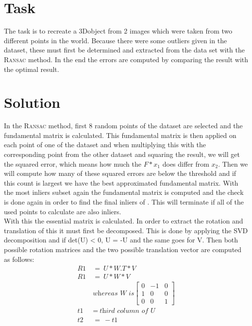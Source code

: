\documentclass{report}
\begin{document}
	\section{Task}
	\startsection
		The task is to recreate a 3Dobject from 2 images which were taken from two different points in the world. Because there were some outliers given in the dataset, these must first be determined and extracted from the data set with the \textsc{Ransac} method. In the end the errors are computed by comparing the result with the optimal result.
	\closesection
	
	\section{Solution}
	\startsection
		In the \textsc{Ransac} method, first 8 random points of the dataset are selected and the fundamental matrix is calculated. This fundamental matrix is then applied on each point of one of the dataset and when multiplying this with the corresponding point from the other dataset and squaring the result, we will get the squared error, which means how much the $F*x_1$ does differ from $x_2$. Then we will compute how many of these squared errors are below the threshold and if this count is largest we have the best approximated fundamental matrix. With the most inliers subset again the fundamental matrix is computed and the check is done again in order to find the final inliers of . This will terminate if all of the used points to calculate  are also inliers. \\
		With this  the essential matrix  is calculated. In order to extract the rotation and translation of this  it must first be decomposed. This is done by applying the SVD decomposition and if det(U) < 0, U = -U and the same goes for V. Then both possible rotation matrices and the two possible translation vector are computed as follows:
		\begin{align*}
			R1 \ &= \  U * W.T * V \\
			R1 \ &= \  U * W * V \\
			& \textit{whereas } W \textit{ is} \begin{bmatrix} 0 & -1 & 0 \\ 1 & 0 & 0 \\ 0 & 0 & 1\end{bmatrix} \\
			t1 \ &= \ \textit{third column of U} \\
			t2 \ &= \ -t1
		\end{align*}
\end{document}
